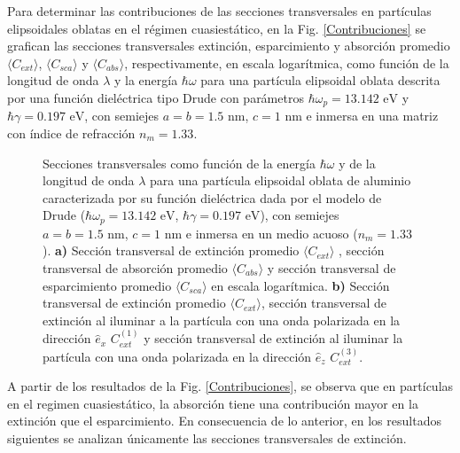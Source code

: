 Para determinar las contribuciones de las secciones transversales en partículas elipsoidales oblatas en el régimen cuasiestático, en la Fig. \ref{Contribuciones} se grafican las secciones transversales extinción, esparcimiento y absorción promedio $\langle C_{ext}\rangle$, $\langle C_{sca}\rangle$ y $\langle C_{abs}\rangle$, respectivamente, en escala logarítmica, como función de la longitud de
onda $\lambda$ y la energía $\hbar\omega$ para una partícula elipsoidal oblata descrita por una función dieléctrica tipo Drude con parámetros $\hbar\omega_p=13.142\text{ eV}$ y $\hbar\gamma=0.197\text{ eV}$, con semiejes $a=b=1.5\text{ nm}$, $c=1\text{ nm}$ e inmersa en una matriz con índice de refracción $n_m=1.33$. 
\begin{figure}[h!]
	\quad%
	\caption{Secciones transversales como función de la energía $\hbar\omega$ y de la longitud de onda $\lambda$ para una partícula elipsoidal oblata de aluminio caracterizada por su función dieléctrica dada por el modelo de Drude ($\hbar\omega_p=13.142\text{ eV}$, $\hbar\gamma=0.197\text{ eV}$), con semiejes $a=b=1.5\text{ nm}$, $c=1\text{ nm}$ e inmersa en un medio acuoso ($n_m=1.33$). \textbf{a)}  Sección transversal de extinción promedio $\langle C_{ext}\rangle$ , sección transversal de absorción promedio $\langle C_{abs}\rangle$ y sección transversal de esparcimiento promedio $\langle C_{sca}\rangle$ en escala logarítmica. \textbf{b)} Sección transversal de extinción promedio $\langle C_{ext}\rangle$, sección transversal de extinción al iluminar a la partícula con una onda polarizada en la dirección $\hat{e}_x$ $C_{ext}^{(1)}$  y sección transversal de extinción al iluminar la partícula con una onda polarizada en la dirección $\hat{e}_z$ $C_{ext}^{(3)}$.} \label{fig:test}
\end{figure}

\noindent A partir de los resultados de la Fig. \ref{Contribuciones}, se observa que en partículas en el regimen cuasiestático, la absorción tiene una contribución mayor en la extinción que el esparcimiento. En consecuencia de lo anterior, en los resultados siguientes se analizan únicamente las secciones transversales de extinción. \\


